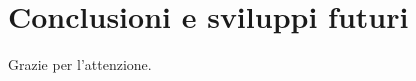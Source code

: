\documentclass{beamer}
\begin{document}
\section{Conclusioni e sviluppi futuri}

\begin{frame}
\begin{center}
Grazie per l'attenzione.
\end{center}
\end{frame}
\end{document}
